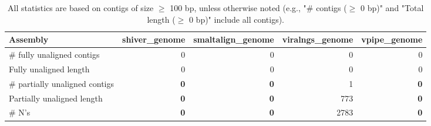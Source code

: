 \documentclass[12pt,a4paper]{article}
\begin{document}
\begin{table}[ht]
\begin{center}
\caption{All statistics are based on contigs of size $\geq$ 100 bp, unless otherwise noted (e.g., "\# contigs ($\geq$ 0 bp)" and "Total length ($\geq$ 0 bp)" include all contigs).}
\begin{tabular}{|l*{4}{|r}|}
\hline
Assembly & shiver\_genome & smaltalign\_genome & viralngs\_genome & vpipe\_genome \\ \hline
\# fully unaligned contigs & 0 & 0 & 0 & 0 \\ \hline
Fully unaligned length & 0 & 0 & 0 & 0 \\ \hline
\# partially unaligned contigs & {\bf 0} & {\bf 0} & 1 & {\bf 0} \\ \hline
Partially unaligned length & {\bf 0} & {\bf 0} & 773 & {\bf 0} \\ \hline
\# N's & {\bf 0} & {\bf 0} & 2783 & {\bf 0} \\ \hline
\end{tabular}
\end{center}
\end{table}
\end{document}

